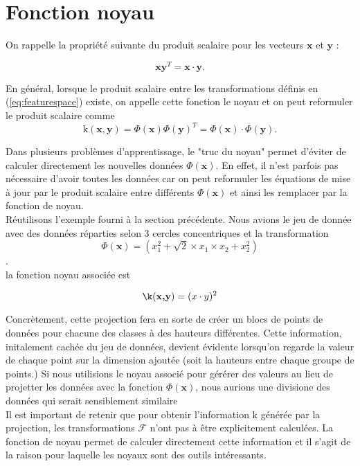 \section{Fonction noyau}\label{sec:kernel}

On rappelle la propriété suivante du produit scalaire pour les vecteurs $\textbf{x}$ et $\textbf{y}$ : 

$$\textbf{x}\textbf{y}^T = \textbf{x} \cdot \textbf{y}.$$

En général, lorsque le produit scalaire entre les transformations définis en (\ref{eq:featurespace}) existe, on appelle cette fonction le noyau et on peut reformuler le produit scalaire comme
$$\textrm{k}(\textbf{x}, \textbf{y}) = \Phi(\textbf{x})\Phi(\textbf{y})^T = \Phi(\textbf{x})\cdot \Phi(\textbf{y}).$$

Dans plusieurs problèmes d'apprentissage, le "truc du noyau" permet d'éviter de calculer directement les nouvelles données $\Phi(\textbf{x})$. 
En effet, il n'est parfois pas nécessaire d'avoir toutes les données car on peut reformuler les équations de mise à jour par le produit scalaire 
entre différents $\Phi(\textbf{x})$ et ainsi les remplacer par la fonction de noyau. \\

Réutilisons l'exemple fourni à la section précédente. Nous avions le jeu de donnée avec des données réparties selon 3 cercles concentriques 
et la transformation $$\Phi(\textbf{x})= (x_1^2 + \sqrt{2} \times x_1\times x_2 + x_2^2)$$. \\ la fonction noyau associée est

$$\k(\textbf{x,y})= (x \cdot y)^2$$

Concrètement, cette projection fera en sorte de créer un blocs de points de données pour chacune des classes à des hauteurs différentes. Cette information, 
initalement cachée du jeu de données, devient évidente lorsqu'on regarde la valeur de chaque point sur la dimension ajoutée (soit la hauteurs entre chaque groupe de points.)
Si nous utilisions le noyau associé pour gérérer des valeurs au lieu de projetter les données avec la fonction $\Phi(\textbf{x})$,
nous aurions une divisione des données qui serait sensiblement similaire \\ 

Il est important de retenir que pour obtenir l’information $\textrm{k}$ générée par la projection, les transformations $\mathcal{F}$ n'ont pas à être explicitement calculées. 
La fonction de noyau permet de calculer directement cette information et il s’agit de la raison pour laquelle les noyaux sont des outils intéressants. \\

